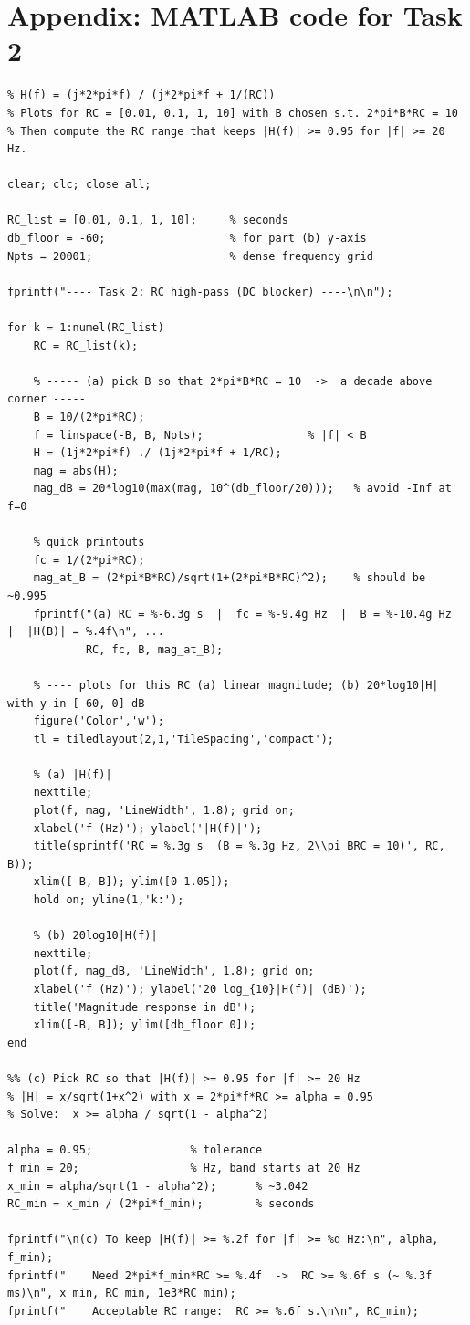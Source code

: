 \documentclass[11pt]{article}
\begin{document}
\section*{Appendix: MATLAB code for Task 2}

\begin{lstlisting}[style=mcode,caption={Task 2 MATLAB script (DC Blocker magnitude and dB plots).}]
%% Task 2: DC blocker (RC high-pass) quality
% H(f) = (j*2*pi*f) / (j*2*pi*f + 1/(RC))
% Plots for RC = [0.01, 0.1, 1, 10] with B chosen s.t. 2*pi*B*RC = 10
% Then compute the RC range that keeps |H(f)| >= 0.95 for |f| >= 20 Hz.

clear; clc; close all;

RC_list = [0.01, 0.1, 1, 10];     % seconds
db_floor = -60;                   % for part (b) y-axis
Npts = 20001;                     % dense frequency grid

fprintf("---- Task 2: RC high-pass (DC blocker) ----\n\n");

for k = 1:numel(RC_list)
    RC = RC_list(k);

    % ----- (a) pick B so that 2*pi*B*RC = 10  ->  a decade above corner -----
    B = 10/(2*pi*RC);
    f = linspace(-B, B, Npts);                % |f| < B
    H = (1j*2*pi*f) ./ (1j*2*pi*f + 1/RC);
    mag = abs(H);
    mag_dB = 20*log10(max(mag, 10^(db_floor/20)));   % avoid -Inf at f=0

    % quick printouts
    fc = 1/(2*pi*RC);
    mag_at_B = (2*pi*B*RC)/sqrt(1+(2*pi*B*RC)^2);    % should be ~0.995
    fprintf("(a) RC = %-6.3g s  |  fc = %-9.4g Hz  |  B = %-10.4g Hz  |  |H(B)| = %.4f\n", ...
            RC, fc, B, mag_at_B);

    % ---- plots for this RC (a) linear magnitude; (b) 20*log10|H| with y in [-60, 0] dB
    figure('Color','w');
    tl = tiledlayout(2,1,'TileSpacing','compact');

    % (a) |H(f)|
    nexttile;
    plot(f, mag, 'LineWidth', 1.8); grid on;
    xlabel('f (Hz)'); ylabel('|H(f)|');
    title(sprintf('RC = %.3g s  (B = %.3g Hz, 2\\pi BRC = 10)', RC, B));
    xlim([-B, B]); ylim([0 1.05]);
    hold on; yline(1,'k:');

    % (b) 20log10|H(f)|
    nexttile;
    plot(f, mag_dB, 'LineWidth', 1.8); grid on;
    xlabel('f (Hz)'); ylabel('20 log_{10}|H(f)| (dB)');
    title('Magnitude response in dB');
    xlim([-B, B]); ylim([db_floor 0]);
end

%% (c) Pick RC so that |H(f)| >= 0.95 for |f| >= 20 Hz
% |H| = x/sqrt(1+x^2) with x = 2*pi*f*RC >= alpha = 0.95
% Solve:  x >= alpha / sqrt(1 - alpha^2)

alpha = 0.95;               % tolerance
f_min = 20;                 % Hz, band starts at 20 Hz
x_min = alpha/sqrt(1 - alpha^2);      % ~3.042
RC_min = x_min / (2*pi*f_min);        % seconds

fprintf("\n(c) To keep |H(f)| >= %.2f for |f| >= %d Hz:\n", alpha, f_min);
fprintf("    Need 2*pi*f_min*RC >= %.4f  ->  RC >= %.6f s (~ %.3f ms)\n", x_min, RC_min, 1e3*RC_min);
fprintf("    Acceptable RC range:  RC >= %.6f s.\n\n", RC_min);
\end{lstlisting}
\end{document}
